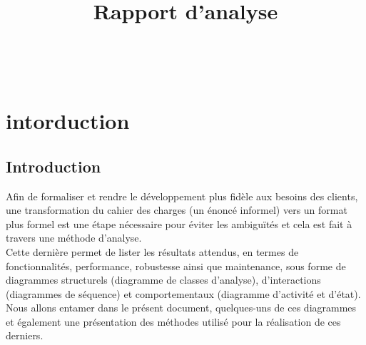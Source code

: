\documentclass[11pt,fleqn]{book} %
\begin{document}
\title{Rapport d'analyse}

\begingroup
{}
\endgroup


\newpage
~\vfill
\thispagestyle{empty}




\pagestyle{empty} %

\tableofcontents %


\pagestyle{fancy} %


\chapter{intorduction}
\section{Introduction}
Afin de formaliser et rendre le développement plus fidèle aux besoins des clients, une transformation du cahier des charges (un énoncé informel) vers un format plus formel est une étape nécessaire pour éviter les ambiguïtés et cela est fait à travers une 
méthode d’analyse. \\
Cette dernière permet de lister les résultats attendus, en termes de fonctionnalités, performance, robustesse ainsi que maintenance, sous forme de diagrammes structurels (diagramme de classes d’analyse), d’interactions (diagrammes de séquence) et comportementaux (diagramme d’activité et d’état).\\
Nous allons entamer dans le présent document, quelques-uns de ces diagrammes et également une présentation des méthodes utilisé pour la réalisation de ces derniers.
\end{document}
